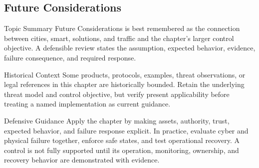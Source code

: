 \documentclass[11pt,letterpaper]{article}
\begin{document}
\subsection*{Future Considerations}
\begin{CornellNotesTable}
\end{CornellNotesTable}
\begin{CornellSummaryBox}{Topic Summary}
Future Considerations is best remembered as the connection between cities, smart, solutions, and traffic and the chapter's larger control objective. A defensible review states the assumption, expected behavior, evidence, failure consequence, and required response.
\end{CornellSummaryBox}
\begin{CornellWarningBox}{Historical Context}
Some products, protocols, examples, threat observations, or legal references in this chapter are historically bounded. Retain the underlying threat model and control objective, but verify present applicability before treating a named implementation as current guidance.
\end{CornellWarningBox}
\begin{CornellOverviewBox}{Defensive Guidance}
Apply the chapter by making assets, authority, trust, expected behavior, and failure response explicit. In practice, evaluate cyber and physical failure together, enforce safe states, and test operational recovery. A control is not fully supported until its operation, monitoring, ownership, and recovery behavior are demonstrated with evidence.
\end{CornellOverviewBox}
\end{document}
